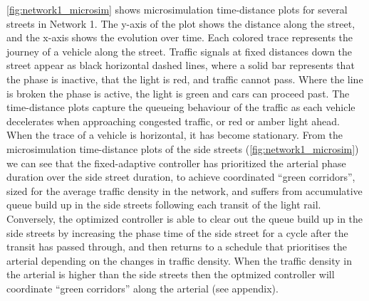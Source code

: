 \cref{fig:network1_microsim} shows microsimulation time-distance plots for several streets in Network 1. The y-axis of the plot
shows the distance along the street, and the x-axis shows the evolution over time. Each colored trace represents the journey of a vehicle along the street. Traffic signals at fixed distances down the street appear as black horizontal dashed lines, where a solid bar represents that the phase is inactive, that the light is red, and traffic cannot pass. Where the line is broken the phase is active, the light is green and cars can proceed past. The time-distance plots capture the queueing behaviour of the traffic as each vehicle decelerates when approaching congested traffic, or red or amber light ahead. When the trace of a vehicle is horizontal, it has become stationary.
From the microsimulation time-distance plots of the side streets (\cref{fig:network1_microsim}) we can see that the fixed-adaptive controller has prioritized the arterial phase duration over the side street duration, to achieve coordinated ``green corridors'', sized for the average traffic density in the network, and suffers from accumulative queue build up in the side streets following each transit of the light rail.
Conversely, the optimized controller is able to clear out the queue build up in the side streets by increasing the phase time of the side street for a cycle after the transit has passed through, and then returns to a schedule that prioritises the arterial depending on the changes in traffic density. When the traffic density in the arterial is higher than the side streets then the optmized controller will coordinate ``green corridors'' along the arterial (see appendix).

\begin{figure*}[t!] \centering

%
\vspace{-5mm}
\caption{Microsimulation time-distance plots of side street $q_5$ to $q_6$ and arterial $q_2$ to $q_{13}$ in Network 1 with the slow light rail schedule. The fixed-adaptive controller has prioritized the arterial phase duration (c) over the side street duration (a) and suffers from accumulative queue build up in the side streets following each transit of the light rail.
%
The optimized controller is able to clear out the queue build up in the side streets by increasing the phase time of the side street (b) for a cycle after the transit has passed through, and then returns to a schedule that prioritizes the arterial (d) depending on the changes in traffic density.}
%
\label{fig:network1_microsim}
\end{figure*}

